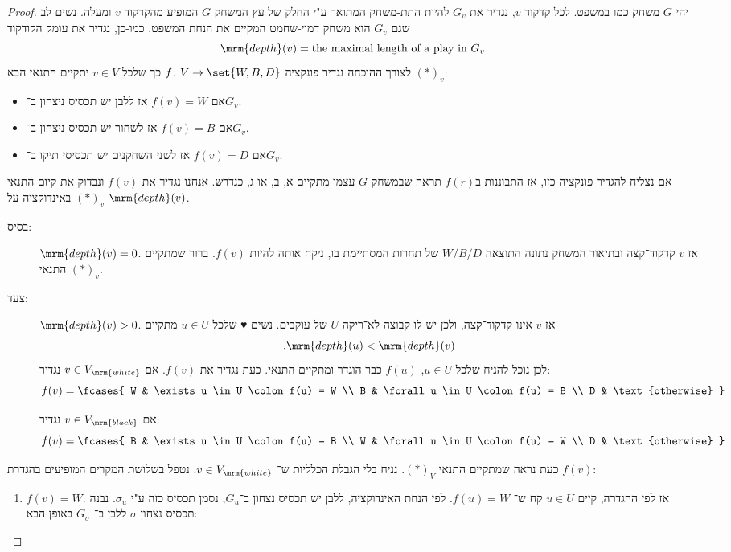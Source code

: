 \documentclass[a4paper,10pt,twoside,openany]{book}
\begin{document}
\begin{proof}
יהי $G$ משחק כמו במשפט. לכל קדקוד $v$, נגדיר את $G_v$ להיות התת-משחק המתואר ע"י החלק של עץ המשחק $G$ המופיע מהקדקוד $v$ ומעלה. נשים לב שגם $G_v$ הוא משחק דמוי-שחמט המקיים את הנחת המשפט. כמו-כן, נגדיר את עומק הקודקוד
\[
\mrm{depth}(v) = \text{the maximal length of a play in $G_v$}
\]
לצורך ההוכחה נגדיר פונקציה $f \colon V \to \set{W,B,D}$
כך שלכל $v \in V$ יתקיים התנאי הבא 
$(*)_v$:
\begin{itemize}
\item אם $f(v) = W$ אז ללבן יש תכסיס ניצחון ב־$G_v$.
\item אם $f(v) = B$ אז לשחור יש תכסיס ניצחון ב־$G_v$.
\item אם $f(v) = D$ אז לשני השחקנים יש תכסיסי תיקו ב־$G_v$.
\end{itemize}
אם נצליח להגדיר פונקציה כזו, אז התבוננות ב$f(r)$ תראה שבמשחק $G$ עצמו מתקיים א, ב, או ג, כנדרש. אנחנו נגדיר את $f(v)$ ונבדוק את קיום התנאי $(*)_v$ באינדוקציה על 
$\mrm{depth}(v)$.

\begin{description}
\item[בסיס:] $\mrm{depth}(v) = 0$. 
אז $v$ קדקוד־קצה ובתיאור המשחק נתונה התוצאה $W/B/D$ של תחרות המסתיימת בו, ניקח אותה להיות $f(v)$. ברור שמתקיים התנאי $(*)_v$.
\item[צעד:] $\mrm{depth}(v) > 0$. אז $v$ אינו קדקוד־קצה, ולכן יש לו קבוצה לא־ריקה $U$ של עוקבים. 
נשים ♥ שלכל $u \in U$ מתקיים
\[ 
\text{.}\mrm{depth}(u) < \mrm{depth}(v)
\]
לכן נוכל להניח שלכל
$u \in U$, 
$f(u)$ 
כבר הוגדר ומתקיים התנאי. כעת נגדיר את $f(v)$. 
אם
$v \in V_{\mrm{white}}$
נגדיר:
\[f(v) = \fcases{
W & \exists u \in U \colon f(u) = W \\
B & \forall u \in U \colon f(u) = B \\
D & \text{otherwise}
}\]

 
אם
$v \in V_{\mrm{black}}$
נגדיר:
\[f(v) = \fcases{
B & \exists u \in U \colon f(u) = B \\
W & \forall u \in U \colon f(u) = W \\
D & \text{otherwise}
}\]
\end{description}
כעת נראה שמתקיים התנאי $(*)_V$. נניח בלי הגבלת הכלליות ש־ 
$v \in V_{\mrm{white}}$.
נטפל בשלושת המקרים המופיעים בהגדרת
$f(v)$:
\begin{enumerate}
\item $f(v) = W$. 
אז לפי ההגדרה, קיים $u \in U$ קח ש־
$f(u) = W$.
לפי הנחת האינדוקציה, ללבן יש תכסיס נצחון ב־$G_u$, נסמן תכסיס כזה ע"י
$\sigma_u$.
נבנה תכסיס נצחון $\sigma$ ללבן 
ב־
$G_{\sigma}$
באופן הבא:



\end{enumerate}
\end{proof}
\end{document}
